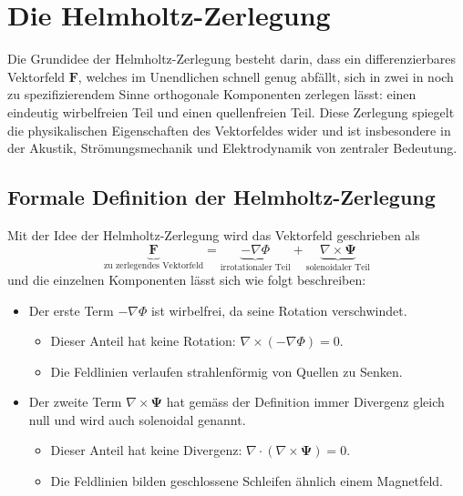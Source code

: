 %
%
%
%
\section{Die Helmholtz-Zerlegung
\label{helmholtz:section:Helmholtz_Zerlegung}}

Die Grundidee der Helmholtz-Zerlegung besteht darin, dass ein
differenzierbares  Vektorfeld $\boldsymbol{F}$, welches im Unendlichen
schnell genug abfällt, sich in zwei in noch zu spezifizierendem
Sinne orthogonale Komponenten zerlegen lässt: einen eindeutig
wirbelfreien Teil und einen quellenfreien Teil.
Diese Zerlegung spiegelt die physikalischen Eigenschaften des
Vektorfeldes wider und ist insbesondere in der Akustik, Strömungsmechanik
und Elektrodynamik von zentraler Bedeutung.

\subsection{Formale Definition der Helmholtz-Zerlegung
\label{helmholtz:subsection:def_Helmholtz_Zerlegung}}

Mit der Idee der Helmholtz-Zerlegung wird das Vektorfeld geschrieben als
\begin{equation}
\underbrace{
\boldsymbol{F}
}_{
\textstyle\text{zu zerlegendes Vektorfeld}
}
=
\underbrace{
-\nabla \Phi
}_{
\text{irrotationaler Teil}
}
+
\underbrace{
\nabla \times \boldsymbol{\Psi}
}_{
\textstyle\text{solenoidaler Teil}
}
\label{helmholtz:equationAllgemein}
\end{equation}
und die einzelnen Komponenten lässt sich wie folgt beschreiben:

\begin{itemize}
\item
Der erste Term $ -\nabla \Phi $ ist wirbelfrei, da seine Rotation verschwindet.
\begin{itemize}
\item
Dieser Anteil hat keine Rotation: $\nabla \times (-\nabla \Phi) = 0$.
\item
Die Feldlinien verlaufen strahlenförmig von Quellen zu Senken.
\end{itemize}

\item
Der zweite Term $\nabla \times \boldsymbol{\Psi}$ hat gemäss der
Definition immer Divergenz gleich null und wird auch solenoidal
genannt.
\begin{itemize}
\item
Dieser Anteil hat keine Divergenz: $\nabla \cdot (\nabla \times
\boldsymbol{\Psi}) = 0$.
\item
Die Feldlinien bilden geschlossene Schleifen ähnlich einem Magnetfeld.
\end{itemize}
\end{itemize}

